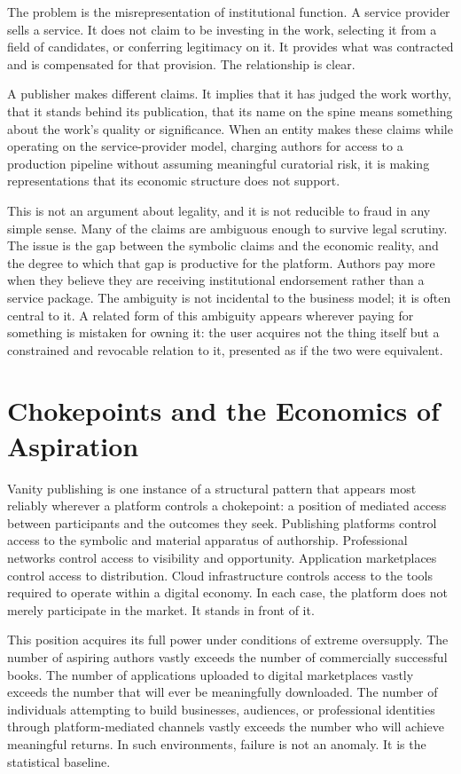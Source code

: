 \documentclass[12pt, a4paper]{article}
\begin{document}
The problem is the misrepresentation of institutional function. A service provider sells a service. It does not claim to be investing in the work, selecting it from a field of candidates, or conferring legitimacy on it. It provides what was contracted and is compensated for that provision. The relationship is clear.

A publisher makes different claims. It implies that it has judged the work worthy, that it stands behind its publication, that its name on the spine means something about the work's quality or significance. When an entity makes these claims while operating on the service-provider model, charging authors for access to a production pipeline without assuming meaningful curatorial risk, it is making representations that its economic structure does not support.

This is not an argument about legality, and it is not reducible to fraud in any simple sense. Many of the claims are ambiguous enough to survive legal scrutiny. The issue is the gap between the symbolic claims and the economic reality, and the degree to which that gap is productive for the platform. Authors pay more when they believe they are receiving institutional endorsement rather than a service package. The ambiguity is not incidental to the business model; it is often central to it. A related form of this ambiguity appears wherever paying for something is mistaken for owning it: the user acquires not the thing itself but a constrained and revocable relation to it, presented as if the two were equivalent.

\section{Chokepoints and the Economics of Aspiration}

Vanity publishing is one instance of a structural pattern that appears most reliably wherever a platform controls a chokepoint: a position of mediated access between participants and the outcomes they seek. Publishing platforms control access to the symbolic and material apparatus of authorship. Professional networks control access to visibility and opportunity. Application marketplaces control access to distribution. Cloud infrastructure controls access to the tools required to operate within a digital economy. In each case, the platform does not merely participate in the market. It stands in front of it.

This position acquires its full power under conditions of extreme oversupply. The number of aspiring authors vastly exceeds the number of commercially successful books. The number of applications uploaded to digital marketplaces vastly exceeds the number that will ever be meaningfully downloaded. The number of individuals attempting to build businesses, audiences, or professional identities through platform-mediated channels vastly exceeds the number who will achieve meaningful returns. In such environments, failure is not an anomaly. It is the statistical baseline.
\end{document}
